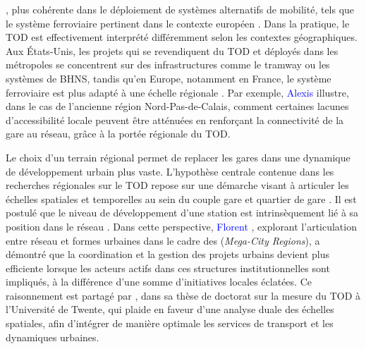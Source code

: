 \begin{refsegment}
{}, plus cohérente dans le déploiement de systèmes alternatifs de mobilité, tels que le système ferroviaire pertinent dans le contexte européen \textcolor{blue}{\autocite[212]{bertolini_sustainable_2005}}. Dans la pratique, le \acrshort{TOD} est effectivement interprété différemment selon les contextes géographiques. Aux États-Unis, les projets qui se revendiquent du \acrshort{TOD} et déployés dans les métropoles se concentrent sur des infrastructures  comme le tramway ou les systèmes de \acrfull{BHNS}, tandis qu’en Europe, notamment en France, le système ferroviaire est plus adapté à une échelle régionale \textcolor{blue}{\autocite[95]{bonin_evaluation_2015}}. Par exemple, \textcolor{blue}{Alexis} \textcolor{blue}{\textcite[132]{conesa_accessibility_2018}} illustre, dans le cas de l’ancienne région Nord-Pas-de-Calais, comment certaines lacunes d’accessibilité locale peuvent être atténuées en renforçant la connectivité de la gare au réseau, grâce à la portée régionale du \acrshort{TOD}.%

Le choix d’un terrain régional permet de replacer les gares dans une dynamique de développement urbain plus vaste. L’hypothèse centrale contenue dans les recherches régionales sur le \acrshort{TOD} repose sur une démarche visant à articuler les échelles spatiales et temporelles au sein du couple gare et quartier de gare \textcolor{blue}{\autocite[14]{menerault_gares_2001}}. Il est postulé que le niveau de développement d’une station est intrinsèquement lié à sa position dans le réseau \textcolor{blue}{\autocite[344]{bertolini_nodes_1996}}. Dans cette perspective, \textcolor{blue}{Florent} \textcolor{blue}{\textcite[5]{le_nechet_modelling_2019}}, explorant l’articulation entre réseau et formes urbaines dans le cadre des  (\textsl{Mega-City Regions}), a démontré que la coordination et la gestion des projets urbains devient plus efficiente lorsque les acteurs actifs dans ces structures institutionnelles sont impliqués, à la différence d'une somme d'initiatives locales éclatées. Ce raisonnement est partagé par \textcolor{blue}{\textcite[55, 111]{singh_measuring_2015}}, dans sa thèse de doctorat sur la mesure du \acrshort{TOD} à l'Université de Twente, qui plaide en faveur d’une analyse duale des échelles spatiales, afin d’intégrer de manière optimale les services de transport et les dynamiques urbaines.%


\end{refsegment}
